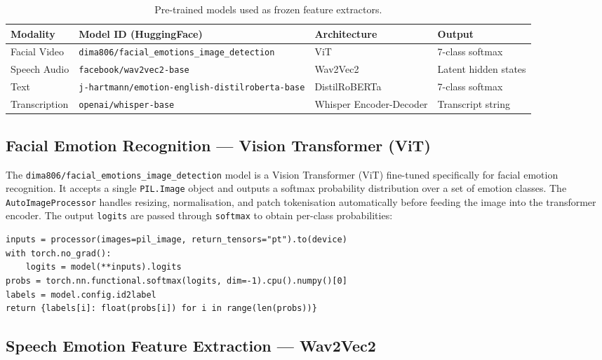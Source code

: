 \documentclass[12pt,a4paper]{article}
\begin{document}
\begin{table}[H]
\centering
\caption{Pre-trained models used as frozen feature extractors.}
\label{tab:models}
\begin{tabular}{llll}
\toprule
\textbf{Modality} & \textbf{Model ID (HuggingFace)} & \textbf{Architecture} & \textbf{Output} \\
\midrule
Facial Video & \texttt{dima806/facial\_emotions\_image\_detection} & ViT & 7-class softmax \\
Speech Audio & \texttt{facebook/wav2vec2-base} & Wav2Vec2 & Latent hidden states \\
Text & \texttt{j-hartmann/emotion-english-distilroberta-base} & DistilRoBERTa & 7-class softmax \\
Transcription & \texttt{openai/whisper-base} & Whisper Encoder-Decoder & Transcript string \\
\bottomrule
\end{tabular}
\end{table}

\subsection{Facial Emotion Recognition — Vision Transformer (ViT)}

The \texttt{dima806/facial\_emotions\_image\_detection} model is a
Vision Transformer (ViT) fine-tuned specifically for facial emotion
recognition. It accepts a single \texttt{PIL.Image} object and outputs a
softmax probability distribution over a set of emotion classes. The
\texttt{AutoImageProcessor} handles resizing, normalisation, and patch
tokenisation automatically before feeding the image into the transformer
encoder. The output \texttt{logits} are passed through \texttt{softmax} to
obtain per-class probabilities:

\begin{lstlisting}[caption={ViT inference for a single frame.}]
inputs = processor(images=pil_image, return_tensors="pt").to(device)
with torch.no_grad():
    logits = model(**inputs).logits
probs = torch.nn.functional.softmax(logits, dim=-1).cpu().numpy()[0]
labels = model.config.id2label
return {labels[i]: float(probs[i]) for i in range(len(probs))}
\end{lstlisting}

\subsection{Speech Emotion Feature Extraction — Wav2Vec2}
\end{document}
